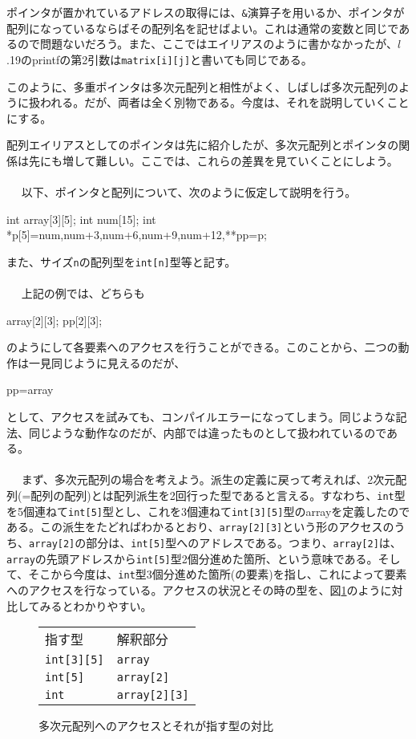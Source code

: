 ポインタが置かれているアドレスの取得には、\verb|&|演算子を用いるか、ポインタが配列になっているならばその配列名を記せばよい。これは通常の変数と同じであるので問題ないだろう。また、ここではエイリアスのように書かなかったが、$l$.19のprintfの第2引数は\verb|matrix[i][j]|と書いても同じである。

このように、多重ポインタは多次元配列と相性がよく、しばしば多次元配列のように扱われる。だが、両者は全く別物である。今度は、それを説明していくことにする。

配列エイリアスとしてのポインタは先に紹介したが、多次元配列とポインタの関係は先にも増して難しい。ここでは、これらの差異を見ていくことにしよう。
\\ \\　
以下、ポインタと配列について、次のように仮定して説明を行う。
\begin{code}
int array[3][5];
int num[15];
int *p[5]={num,num+3,num+6,num+9,num+12},**pp=p;
\end{code}
また、サイズ\verb|n|の配列型を\verb|int[n]|型等と記す。
\\ \\　
上記の例では、どちらも
\begin{code}
array[2][3];
pp[2][3];
\end{code}
のようにして各要素へのアクセスを行うことができる。このことから、二つの動作は一見同じように見えるのだが、
\begin{code}
pp=array
\end{code}
として、アクセスを試みても、コンパイルエラーになってしまう。同じような記法、同じような動作なのだが、内部では違ったものとして扱われているのである。
\\ \\　
まず、多次元配列の場合を考えよう。派生の定義に戻って考えれば、2次元配列(=配列の配列)とは配列派生を2回行った型であると言える。すなわち、\verb|int|型を5個連ねて\verb|int[5]|型とし、これを3個連ねて\verb|int[3][5]|型のarrayを定義したのである。この派生をたどればわかるとおり、\verb|array[2][3]|という形のアクセスのうち、\verb|array[2]|の部分は、\verb|int[5]|型へのアドレスである。つまり、\verb|array[2]|は、\verb|array|の先頭アドレスから\verb|int[5]|型2個分進めた箇所、という意味である。そして、そこから今度は、\verb|int|型3個分進めた箇所(の要素)を指し、これによって要素へのアクセスを行なっている。アクセスの状況とその時の型を、図\ref{fig11_1}のように対比してみるとわかりやすい。
\begin{figure}[h]
\centering
\begin{tabular}{ll}
指す型&解釈部分\\
\verb|int[3][5]|&\verb|array| \\
\verb|int[5]|&\verb|array[2]| \\
\verb|int|&\verb|array[2][3]|
\end{tabular}
\caption{多次元配列へのアクセスとそれが指す型の対比}\label{fig11_1}
\end{figure}

